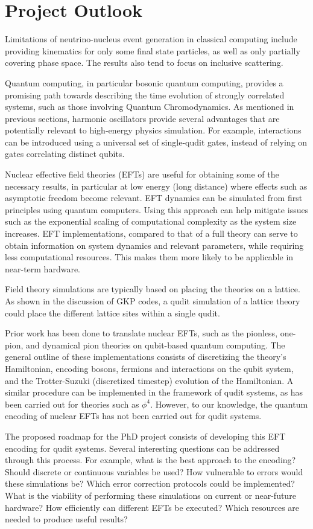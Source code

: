 
\chapter{Project Outlook}

Limitations of neutrino-nucleus event generation in classical computing include providing kinematics for only some final state particles, as well as only partially covering phase space. The results also tend to focus on inclusive scattering.

Quantum computing, in particular bosonic quantum computing, provides a promising path towards describing the time evolution of strongly correlated systems, such as those involving Quantum Chromodynamics. As mentioned in previous sections, harmonic oscillators provide several advantages that are potentially relevant to high-energy physics simulation. For example, interactions can be introduced using a universal set of single-qudit gates, instead of relying on gates correlating distinct qubits.

Nuclear effective field theories (EFTs) are useful for obtaining some of the necessary results, in particular at low energy (long distance) where effects such as asymptotic freedom become relevant. EFT dynamics can be simulated from first principles using quantum computers. Using this approach can help mitigate issues such as the exponential scaling of computational complexity as the system size increases. EFT implementations, compared to that of a full theory can serve to obtain information on system dynamics and relevant parameters, while requiring less computational resources. This makes them more likely to be applicable in near-term hardware.

Field theory simulations are typically based on placing the theories on a lattice. As shown in the discussion of GKP codes, a qudit simulation of a lattice theory could place the different lattice sites within a single qudit. 

Prior work has been done to translate nuclear EFTs, such as the pionless, one-pion, and dynamical pion theories on qubit-based quantum computing. The general outline of these implementations consists of discretizing the theory's Hamiltonian, encoding bosons, fermions and interactions on the qubit system, and the Trotter-Suzuki (discretized timestep) evolution of the Hamiltonian. A similar procedure can be implemented in the framework of qudit systems, as has been carried out for theories such as $\phi^4$. However, to our knowledge, the quantum encoding of nuclear EFTs has not been carried out for qudit systems.

The proposed roadmap for the PhD project consists of developing this EFT encoding for qudit systems. Several interesting questions can be addressed through this process. For example, what is the best approach to the encoding? Should discrete or continuous variables be used? How vulnerable to errors would these simulations be? Which error correction protocols could be implemented? What is the viability of performing these simulations on current or near-future hardware? How efficiently can different EFTs be executed? Which resources are needed to produce useful results?

